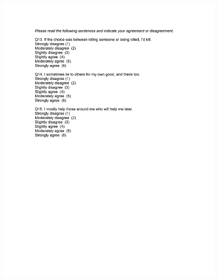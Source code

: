 \documentclass[12pt,econ]{sources/authesis}
\makeatletter
\def\maxwidth{\ifdim\Gin@nat@width>\linewidth\linewidth
\else\Gin@nat@width\fi}
\let\Oldincludegraphics\includegraphics
\renewcommand{\includegraphics}[1]{\Oldincludegraphics[width=\maxwidth]{#1}}
\makeatother
\begin{document}
\begin{figure}[hbt]
  \centering
\includegraphics{data/framing/appendix/questionnaire/questionnaire07.jpg}
\end{figure}
\end{document}
